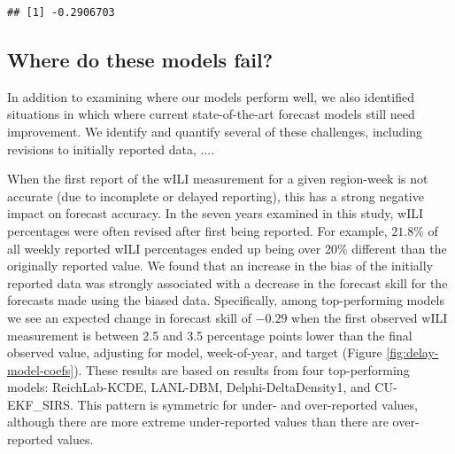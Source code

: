 \documentclass{article}\usepackage[]{graphicx}\usepackage[]{color}
\makeatletter
\newenvironment{kframe}{%
 \def\at@end@of@kframe{}%
 \ifinner\ifhmode%
  \def\at@end@of@kframe{\end{minipage}}%
  \begin{minipage}{\columnwidth}%
 \fi\fi%
 \def\FrameCommand##1{\hskip\@totalleftmargin \hskip-\fboxsep
 \colorbox{shadecolor}{##1}\hskip-\fboxsep
     \hskip-\linewidth \hskip-\@totalleftmargin \hskip\columnwidth}%
 \MakeFramed {\advance\hsize-\width
   \@totalleftmargin\z@ \linewidth\hsize
   \@setminipage}}%
 {\par\unskip\endMakeFramed%
 \at@end@of@kframe}
\newenvironment{knitrout}{}{} %
\makeatother
\begin{document}



% 


\begin{knitrout}
\color{fgcolor}\begin{kframe}
\begin{verbatim}
## [1] -0.2906703
\end{verbatim}
\end{kframe}
\end{knitrout}


\subsection{Where do these models fail?}

In addition to examining where our models perform well, we also identified situations in which where current state-of-the-art forecast models still need improvement. 
We identify and quantify several of these challenges, including revisions to initially reported data, ....

When the first report of the wILI measurement for a given region-week is not accurate (due to incomplete or delayed reporting), this has a strong negative impact on forecast accuracy.
In the seven years examined in this study, wILI percentages were often revised after first being reported. 
For example, $21.8$\% of all weekly reported wILI percentages ended up being over 20\% different than the originally reported value.
We found that an increase in the bias of the initially reported data was strongly associated with a decrease in the forecast skill for the forecasts made using the biased data.
Specifically, among top-performing models we see an expected change in forecast skill of $-0.29$ when the first observed wILI measurement is between 2.5 and 3.5 percentage points lower than the final observed value, adjusting for model, week-of-year, and target (Figure \ref{fig:delay-model-coefs}).
These results are based on results from four top-performing models: ReichLab-KCDE, LANL-DBM, Delphi-DeltaDensity1, and CU-EKF\_SIRS.
This pattern is symmetric for under- and over-reported values, although there are more extreme under-reported values than there are over-reported values. 
\end{document}
